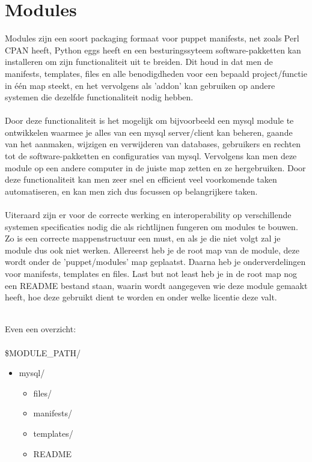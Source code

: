\chapter{Modules}

Modules zijn een soort packaging formaat voor puppet manifests, net zoals Perl CPAN heeft, Python eggs heeft en een besturingssyteem software-pakketten kan installeren om zijn functionaliteit uit te breiden. Dit houd in dat men de manifests, templates, files en alle benodigdheden voor een bepaald project/functie in \'{e}\'{e}n map steekt, en het vervolgens als 'addon' kan gebruiken op andere systemen die dezelfde functionaliteit nodig hebben.\\\\
Door deze functionaliteit is het mogelijk om bijvoorbeeld een mysql module te ontwikkelen waarmee je alles van een mysql server/client kan beheren, gaande van het aanmaken, wijzigen en verwijderen van databases, gebruikers en rechten tot de software-pakketten en configuraties van mysql. Vervolgens kan men deze module op een andere computer in de juiste map zetten en ze hergebruiken. Door deze functionaliteit kan men zeer snel en efficient veel voorkomende taken automatiseren, en kan men zich dus focussen op belangrijkere taken.\\\\
Uiteraard zijn er voor de correcte werking en interoperability op verschillende systemen specificaties nodig die als richtlijnen fungeren om modules te bouwen. Zo is een correcte mappenstructuur een must, en als je die niet volgt zal je module dus ook niet werken. Allereerst heb je de root map van de module, deze wordt onder de 'puppet/modules' map geplaatst. Daarna heb je onderverdelingen voor manifests, templates en files. Last but not least heb je in de root map nog een README bestand staan, waarin wordt aangegeven wie deze module gemaakt heeft, hoe deze gebruikt dient te worden en onder welke licentie deze valt.\\\\
\begin{samepage}
Even een overzicht:\\\\
\$MODULE\_PATH/
	\begin{itemize}
	\item mysql/
		\begin{itemize}
		\item files/
		\item manifests/
		\item templates/
		\item README
		\end{itemize}
	\end{itemize}
\end{samepage}

